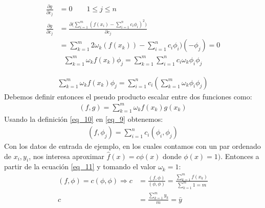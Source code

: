 \documentclass[10pt,a4paper]{article}
\numberwithin{equation}{section}
\numberwithin{figure}{section}
\numberwithin{table}{section}
\begin{document}
\begin{equation}\label{eq_7}
    \begin{split}
        \frac{\partial g }{\partial c_j} &= 0 \qquad 1 \leq j \leq n \\
        \frac{\partial g }{\partial c_j} &= \frac{\partial \big( \sum\limits_{i=1}^m ( f(x_i) - \sum\limits_{i=1}^n  c_i \phi_i)^2 \big) }{\partial c_j}  \\
        &= \sum_{k=1}^m 2\omega_k (f(x_k)) - \sum_{i=1}^n c_i \phi_i) (-\phi_j) = 0
    \end{split}
\end{equation}        
\begin{equation}\label{eq_8}
     \begin{split}
        \sum_{k=1}^m \omega_k f(x_k) \phi_j = \sum_{k=1}^m \sum_{i=1}^n c_i \omega_k \phi_i \phi_j
     \end{split}
\end{equation}

\begin{equation}\label{eq_9}
    \begin{split}
       \sum_{k=1}^m \omega_k f(x_k) \phi_j = \sum_{i=1}^n c_i ( \sum_{k=1}^m  \omega_k \phi_i \phi_j )
    \end{split}
\end{equation}
Debemos definir entonces el pseudo producto escalar entre dos funciones como:
\begin{equation}\label{eq_10}
    \begin{split}
        (f,g) = \sum_{k=1}^m \omega_k f(x_k) g(x_k)
    \end{split}
\end{equation}
Usando la definición \ref*{eq_10} en \ref*{eq_9} obtenemos:
\begin{equation}\label{eq_11}
    \begin{split}
        (f,\phi_j) = \sum_{i=1}^n c_i (\phi_i,\phi_j)
    \end{split}
\end{equation}
Con los datos de entrada de ejemplo, en los cuales contamos con un par ordenado de ${x_i,y_i}$, nos interesa aproximar $\hat{f}(x) = c \phi(x)$ donde $\phi(x) = 1)$. Entonces a partir de la ecuación \ref*{eq_11}
y tomando el valor $\omega_k = 1$:
\begin{equation}
    \begin{split}
        (f,\phi) = c(\phi,\phi) \Longrightarrow c &= \frac{(f,\phi)}{(\phi,\phi)} = \frac{\sum\limits_{k=1}^m f(x_k)}{\sum\limits_{k=1}^m 1 = m} \\
        c &= \frac{\sum\limits_{k=1}^m y_k}{m} = \bar{y}
    \end{split}
\end{equation}
\end{document}
